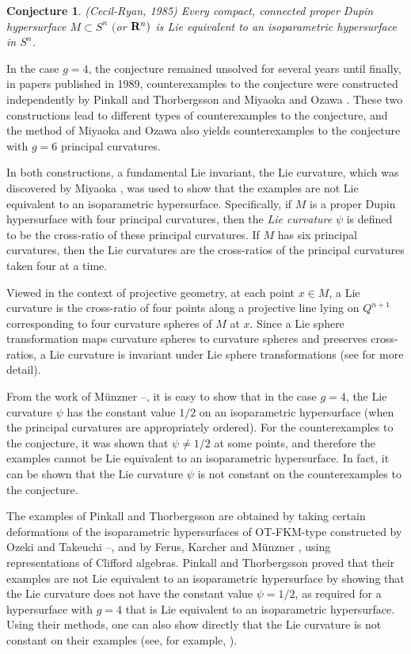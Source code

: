 \documentclass[12pt]{article}
\newtheorem{conjecture}{Conjecture}[section]
\begin{document}
{\begin{conjecture} 
\label{cecil-ryan} 
(Cecil-Ryan, 1985) Every compact, connected proper Dupin hypersurface $M \subset S^n$ $($or ${\bf R}^n)$
is Lie equivalent to an isoparametric hypersurface in $S^n$.
\end{conjecture}


In the case $g=4$, the conjecture remained unsolved
for several years until finally, in papers published in 1989, 
counterexamples to the conjecture were constructed 
independently by Pinkall and Thorbergsson \cite{PT1}
and Miyaoka and Ozawa \cite{MO}. These two constructions lead to different types of counterexamples
to the conjecture, and
the method of Miyaoka and Ozawa also 
yields counterexamples to the conjecture with $g=6$ principal curvatures.  

In both constructions, a fundamental
Lie invariant, the Lie curvature, which was discovered by Miyaoka \cite{Mi3},
was used to show that the examples are not Lie equivalent to
an isoparametric hypersurface.  Specifically, if $M$ is a proper Dupin hypersurface 
with four principal curvatures,
then the {\em Lie curvature} $\psi$ is defined to be
the cross-ratio of these principal curvatures.  If $M$ has six principal curvatures, then the Lie curvatures are the cross-ratios of the principal curvatures taken four at a time.

Viewed in the context of projective geometry, at each point $x \in M$, a Lie curvature
is the cross-ratio of four points along a projective line lying on $Q^{n+1}$ corresponding
to four curvature spheres of $M$ at $x$.  
Since a Lie sphere transformation maps curvature spheres to curvature
spheres and preserves cross-ratios, a Lie curvature is invariant under Lie sphere transformations
(see  \cite[pp. 72--82]{Cec9} for more detail).  

From the work of M\"{u}nzner \cite{Mu}--\cite{Mu2}, 
it is easy to show that in the case $g=4$, the 
Lie curvature $\psi$ has the constant value $1/2$ 
on an isoparametric hypersurface  (when the principal curvatures are appropriately ordered). For
the counterexamples to the conjecture, it was shown that $\psi \neq 1/2$ at some points, and therefore the examples cannot be Lie equivalent to an isoparametric hypersurface.   In fact, it can be shown that the Lie curvature $\psi$
is not constant on the counterexamples to the conjecture.

The examples of Pinkall and Thorbergsson  are obtained by 
taking certain deformations of the isoparametric hypersurfaces
of OT-FKM-type constructed by  Ozeki and Takeuchi \cite{OT}--\cite{OT2}, and by
Ferus, Karcher and M\"{u}nzner \cite{FKM}, using representations of Clifford algebras.  
Pinkall and Thorbergsson proved that their examples are not Lie
equivalent to an isoparametric hypersurface by showing that the Lie curvature does not have the
constant value $\psi = 1/2$, 
as required for a hypersurface with $g=4$ that is Lie equivalent 
to an isoparametric hypersurface.  Using their methods, one can also show directly
that the Lie curvature is not constant on their examples (see, for example,  \cite[pp. 309--314]{CR8}).


}
\end{document}
